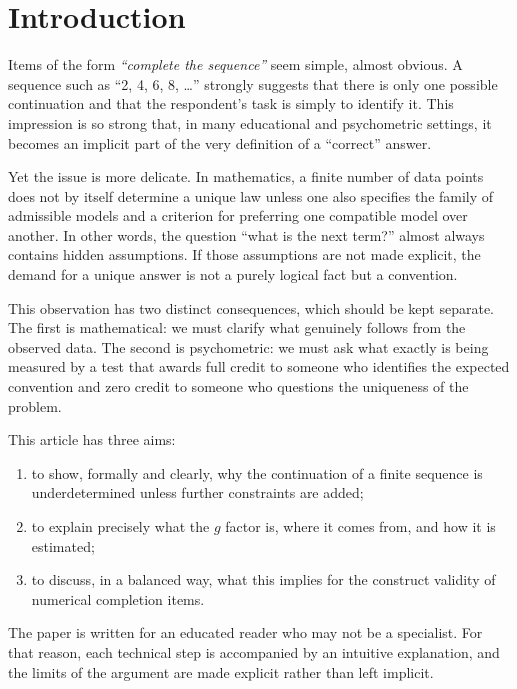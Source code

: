 \documentclass[10pt, a4paper]{article}
\theoremstyle{plain}
\theoremstyle{definition}
\theoremstyle{remark}
\begin{document}
\newpage
\tableofcontents
\newpage
\twocolumn

\section{Introduction}
\label{sec:intro}

Items of the form \emph{``complete the sequence''} seem simple, almost obvious.
A sequence such as ``2, 4, 6, 8, \dots'' strongly suggests that there is only
one possible continuation and that the respondent's task is simply to identify
it. This impression is so strong that, in many educational and psychometric
settings, it becomes an implicit part of the very definition of a ``correct''
answer.

Yet the issue is more delicate. In mathematics, a finite number of data points
does not by itself determine a unique law unless one also specifies the family
of admissible models and a criterion for preferring one compatible model over
another. In other words, the question ``what is the next term?'' almost always
contains hidden assumptions. If those assumptions are not made explicit, the
demand for a unique answer is not a purely logical fact but a convention.

This observation has two distinct consequences, which should be kept separate.
The first is mathematical: we must clarify what genuinely follows from the
observed data. The second is psychometric: we must ask what exactly is being
measured by a test that awards full credit to someone who identifies the
expected convention and zero credit to someone who questions the uniqueness of
the problem.

This article has three aims:
\begin{enumerate}[label=\arabic*.]
    \item to show, formally and clearly, why the continuation of a finite
          sequence is underdetermined unless further constraints are added;
    \item to explain precisely what the $g$ factor is, where it comes from, and
          how it is estimated;
    \item to discuss, in a balanced way, what this implies for the construct
          validity of numerical completion items.
\end{enumerate}

The paper is written for an educated reader who may not be a specialist. For
that reason, each technical step is accompanied by an intuitive explanation, and
the limits of the argument are made explicit rather than left implicit.
\end{document}
